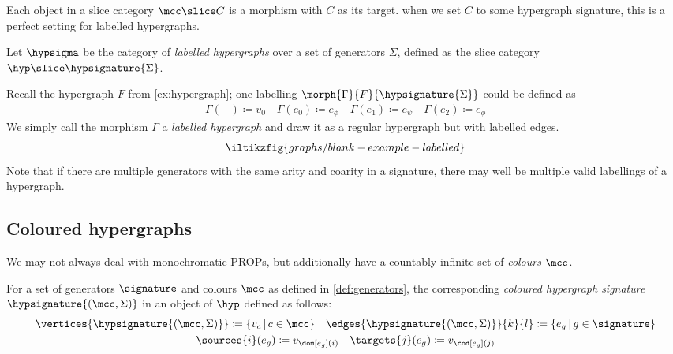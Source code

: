 Each object in a slice category \(\mcc \slice C\) is a morphism with \(C\) as
its target.
when we set \(C\) to some hypergraph signature, this is a perfect setting for
labelled hypergraphs.

\begin{definition}
    Let \(\hypsigma\) be the category of \emph{labelled hypergraphs} over a set
    of generators \(\Sigma\), defined as the slice category
    \(\hyp \slice \hypsignature{\Sigma}\).
\end{definition}

\begin{example}
    Recall the hypergraph \(F\) from \cref{ex:hypergraph}; one labelling
    \(\morph{\Gamma}{F}{\hypsignature{\Sigma}}\) could be defined as
    \begin{gather*}
        \Gamma(-) \coloneqq v_0
        \quad
        \Gamma(e_0) \coloneqq e_\phi
        \quad
        \Gamma(e_1) \coloneqq e_\psi
        \quad
        \Gamma(e_2) \coloneqq e_\phi
    \end{gather*}
    We simply call the morphism \(\Gamma\) a \emph{labelled hypergraph} and
    draw it as a regular hypergraph but with labelled edges.
    \[
        \iltikzfig{graphs/blank-example-labelled}
    \]
    Note that if there are multiple generators with the same arity and coarity
    in a signature, there may well be multiple valid labellings of a hypergraph.
\end{example}

\subsection{Coloured hypergraphs}

We may not always deal with monochromatic PROPs, but additionally have a
countably infinite set of \emph{colours} \(\mcc\).

\begin{definition}
    For a set of generators \(\signature\) and colours \(\mcc\) as defined
    in \cref{def:generators}, the corresponding
    \emph{coloured hypergraph signature}
    \(\hypsignature{(\mcc,\Sigma)}\) in an object of \(\hyp\) defined as
    follows:
    \begin{gather*}
        \vertices{\hypsignature{(\mcc,\Sigma)}} \coloneqq \{ v_c \,|\, c \in \mcc\}
        \quad
        \edges{\hypsignature{(\mcc,\Sigma)}}{k}{l} \coloneqq \{ e_g \,|\, g \in \signature\}
        \\
        \sources{i}(e_g) \coloneqq v_{\dom[e_g](i)}
        \quad
        \targets{j}(e_g) \coloneqq v_{\cod[e_g](j)}
    \end{gather*}
\end{definition}

